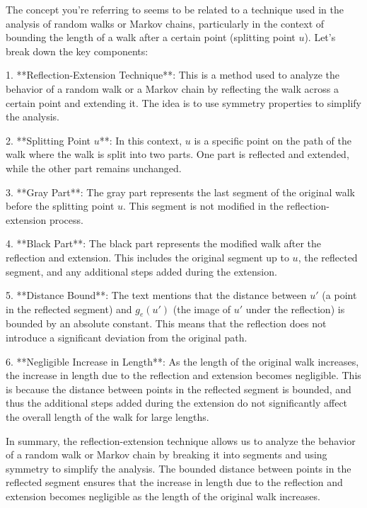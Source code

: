 The concept you're referring to seems to be related to a technique used in the analysis of random walks or Markov chains, particularly in the context of bounding the length of a walk after a certain point (splitting point \( u \)). Let's break down the key components:

1. **Reflection-Extension Technique**: This is a method used to analyze the behavior of a random walk or a Markov chain by reflecting the walk across a certain point and extending it. The idea is to use symmetry properties to simplify the analysis.

2. **Splitting Point \( u \)**: In this context, \( u \) is a specific point on the path of the walk where the walk is split into two parts. One part is reflected and extended, while the other part remains unchanged.

3. **Gray Part**: The gray part represents the last segment of the original walk before the splitting point \( u \). This segment is not modified in the reflection-extension process.

4. **Black Part**: The black part represents the modified walk after the reflection and extension. This includes the original segment up to \( u \), the reflected segment, and any additional steps added during the extension.

5. **Distance Bound**: The text mentions that the distance between \( u' \) (a point in the reflected segment) and \( g_e(u') \) (the image of \( u' \) under the reflection) is bounded by an absolute constant. This means that the reflection does not introduce a significant deviation from the original path.

6. **Negligible Increase in Length**: As the length of the original walk increases, the increase in length due to the reflection and extension becomes negligible. This is because the distance between points in the reflected segment is bounded, and thus the additional steps added during the extension do not significantly affect the overall length of the walk for large lengths.

In summary, the reflection-extension technique allows us to analyze the behavior of a random walk or Markov chain by breaking it into segments and using symmetry to simplify the analysis. The bounded distance between points in the reflected segment ensures that the increase in length due to the reflection and extension becomes negligible as the length of the original walk increases.